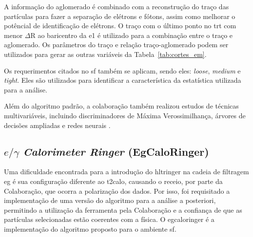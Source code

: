 A informação do aglomerado é combinado com a reconstrução do traço
\cite{physics_perf_expected} das partículas para fazer a separação de elétrons e fótons, assim como melhorar o
potêncial de identificação de elétrons. O traço com o último ponto no \gls{trt}
com menor $\Delta\text{R}$ ao baricentro da \gls{e1} 
é utilizado para a combinação entre o traço e aglomerado. Os parâmetros do traço
e relação traço-aglomerado podem ser utilizados para gerar as outras variáveis
da Tabela~\ref{tab:cortes_em}.

Os requerimentos citados no \gls{sf} também se aplicam, sendo eles: \emph{loose}, 
\emph{medium} e \emph{tight}. Eles são utilizados para
identificar a característica da estatística utilizada para a análise.

Além do algoritmo padrão, a colaboração também realizou estudos de técnicas
multivariáveis, incluindo discriminadores de Máxima Verossimilhança, árvores 
de decisões ampliadas e redes neurais \cite{physics_perf_expected}.


\subsection{\texorpdfstring{$e/\gamma$ \emph{Calorimeter Ringer}
(EgCaloRinger)}{eGamma Calorimeter Ringer (EgCaloRinger)}}
\label{ssec:egringer}

Uma dificuldade encontrada para a introdução do \gls{hltringer} na cadeia de
filtragem \gls{eg} é sua configuração diferente ao \gls{t2calo}, causando o
receio, por parte da Colaboração, que ocorra a polarização dos dados. Por isso, foi requisitado a
implementação de uma versão do algoritmo para a análise a posteriori, permitindo
a utilização da ferramenta pela Colaboração e a confiança de que as partículas
selecionadas estão coerentes com a física. O \gls{egcaloringer} é a
implementação do algoritmo proposto para o ambiente \gls{sf}.

